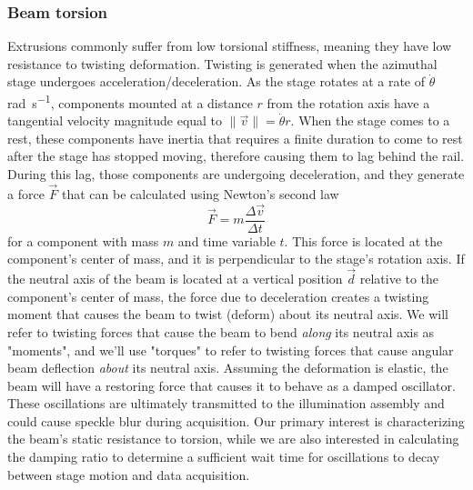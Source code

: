 \subsubsection{Beam torsion}
Extrusions commonly suffer from low torsional stiffness, meaning they have low resistance to twisting deformation. Twisting is generated when the azimuthal stage undergoes acceleration/deceleration. As the stage rotates at a rate of $\dot{\theta}$ \si{\radian \per \second}, components mounted at a distance $r$ from the rotation axis have a tangential velocity magnitude equal to $\|\vec{v}\| = \dot{\theta}r$. When the stage comes to a rest, these components have inertia that requires a finite duration to come to rest after the stage has stopped moving, therefore causing them to lag behind the rail. During this lag, those components are undergoing deceleration, and they generate a force $\vec{F}$ that can be calculated using Newton's second law
%
\begin{equation}
    \vec{F} = m \frac{\Delta \vec{v}}{\Delta t}
    \label{eqn:newtons_second_law}
\end{equation}
%
for a component with mass $m$ and time variable $t$. This force is located at the component's center of mass, and it is perpendicular to the stage's rotation axis. If the neutral axis of the beam is located at a vertical position $\vec{d}$ relative to the component's center of mass, the force due to deceleration creates a twisting moment that causes the beam to twist (deform) about its neutral axis. We will refer to twisting forces that cause the beam to bend \textit{along} its neutral axis as "moments", and we'll use "torques" to refer to twisting forces that cause angular beam deflection \textit{about} its neutral axis. Assuming the deformation is elastic, the beam will have a restoring force that causes it to behave as a damped oscillator. These oscillations are ultimately transmitted to the illumination assembly and could cause speckle blur during acquisition. Our primary interest is characterizing the beam's static resistance to torsion, while we are also interested in calculating the damping ratio to determine a sufficient wait time for oscillations to decay between stage motion and data acquisition.

